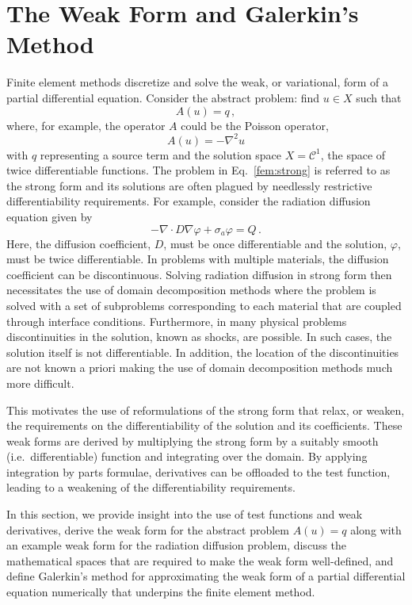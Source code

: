 \documentclass[../doc.tex]{subfiles}
\begin{document}
\section{The Weak Form and Galerkin's Method}
Finite element methods discretize and solve the weak, or variational, form of a partial differential equation. Consider the abstract problem: find $u \in X$ such that 
	\begin{equation} \label{fem:strong}
		A(u) = q \,,
	\end{equation}
where, for example, the operator $A$ could be the Poisson operator, 
	\begin{equation}
		A(u) = -\nabla^2u
	\end{equation}
with $q$ representing a source term and the solution space $X = \mathcal{C}^1$, the space of twice differentiable functions. The problem in Eq.~\ref{fem:strong} is referred to as the strong form and its solutions are often plagued by needlessly restrictive differentiability requirements. For example, consider the radiation diffusion equation given by
	\begin{equation} \label{fem:rad_strong}
		-\nabla\cdot D \nabla\varphi + \sigma_a \varphi = Q \,. 
	\end{equation}
Here, the diffusion coefficient, $D$, must be once differentiable and the solution, $\varphi$, must be twice differentiable. In problems with multiple materials, the diffusion coefficient can be discontinuous. Solving radiation diffusion in strong form then necessitates the use of domain decomposition methods where the problem is solved with a set of subproblems corresponding to each material that are coupled through interface conditions.  Furthermore, in many physical problems discontinuities in the solution, known as shocks, are possible. In such cases, the solution itself is not differentiable. In addition, the location of the discontinuities are not known a priori making the use of domain decomposition methods much more difficult. 

This motivates the use of reformulations of the strong form that relax, or weaken, the requirements on the differentiability of the solution and its coefficients. These weak forms are derived by multiplying the strong form by a suitably smooth (i.e.~differentiable) function and integrating over the domain. By applying integration by parts formulae, derivatives can be offloaded to the test function, leading to a weakening of the differentiability requirements. 

In this section, we provide insight into the use of test functions and weak derivatives, derive the weak form for the abstract problem $A(u) = q$ along with an example weak form for the radiation diffusion problem, discuss the mathematical spaces that are required to make the weak form well-defined, and define Galerkin's method for approximating the weak form of a partial differential equation numerically that underpins the finite element method. 
\end{document}
